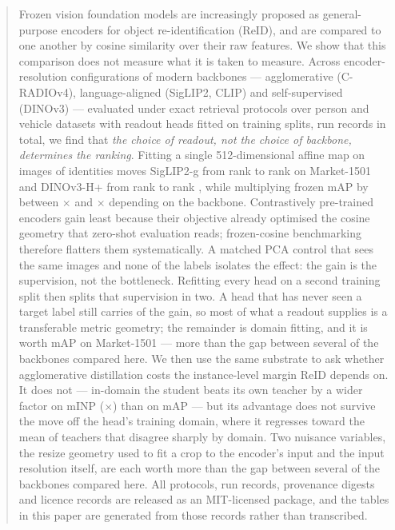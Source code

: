 \begin{abstract}
Frozen vision foundation models are increasingly proposed as general-purpose encoders for
object re-identification (ReID), and are compared to one another by cosine similarity over
their raw features. We show that this comparison does not measure what it is taken to
measure. Across \nEncoderConfigs{} encoder-resolution configurations of \nEncoders{} modern
backbones --- agglomerative (C-RADIOv4), language-aligned (SigLIP2, CLIP) and self-supervised
(DINOv3) --- evaluated under \nProtocols{} exact retrieval protocols over \nDatasets{} person
and vehicle datasets with \nHeadRecipes{} readout heads fitted on \nFitSplits{} training
splits, \nRuns{} run records in total, we find that
\emph{the choice of readout, not the choice of backbone, determines the ranking}. Fitting a
single 512-dimensional affine map on \nHeadImages{} images of \nHeadIdentities{}
identities moves SigLIP2-g from rank \rankSiglipgFrozen{} to rank \rankSiglipgProbed{} on
Market-1501 and DINOv3-H+ from rank \rankDinohpFrozen{} to rank \rankDinohpProbed{}, while
multiplying frozen mAP by between \gainSiglipg{}$\times$ and
\gainDinohp{}$\times$ depending on the backbone. Contrastively pre-trained encoders gain least
because their objective already optimised the cosine geometry that zero-shot evaluation reads;
frozen-cosine benchmarking therefore flatters them systematically. A matched PCA control that
sees the same images and none of the labels isolates the effect: the gain is the supervision,
not the bottleneck. Refitting every head on a second training split then splits that
supervision in two. A head that has never seen a target label still carries
\fitShareArcfaceMarket{} of the gain, so most of what a readout supplies is a transferable
metric geometry; the remainder is domain fitting, and it is worth \fitSwingArcfaceMarket{} mAP
on Market-1501 --- more than the gap between several of the backbones compared here. We then use the same substrate to ask whether agglomerative distillation
costs the instance-level margin ReID depends on. It does not --- in-domain the student beats
its own teacher by a wider factor on mINP (\minpGap{}$\times$) than on mAP --- but its
advantage does not survive the move off the head's training domain, where it regresses toward
the mean of teachers that disagree sharply by domain. Two nuisance variables, the resize
geometry used to fit a crop to the encoder's input and the input resolution itself, are each
worth more than the gap between several of the backbones compared here. All protocols, run
records, provenance digests and licence records are released as an MIT-licensed package, and
the tables in this paper are generated from those records rather than transcribed.
\end{abstract}
